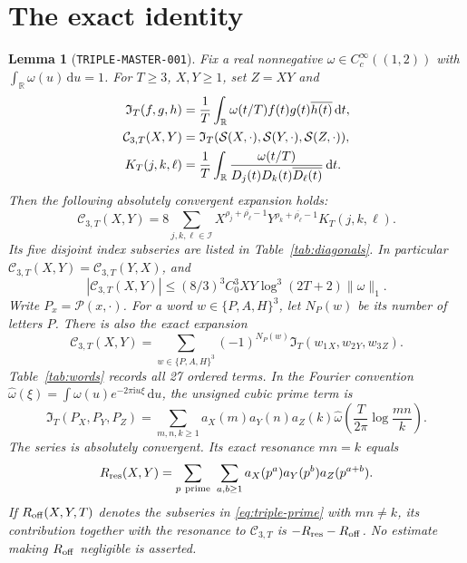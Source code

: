 \documentclass[11pt]{article}
\newtheorem{lemma}{Lemma}
\newcommand{\ii}{\mathrm i}
\newcommand{\ZS}{\mathcal S}
\newcommand{\PS}{\mathcal P}
\newcommand{\CT}{\mathcal C_{3,T}}
\newcommand{\IT}{\mathfrak I_T}
\newcommand{\dd}{\,\mathrm d}
\begin{document}
\section{The exact identity}

\begin{lemma}[\texttt{TRIPLE-MASTER-001}]\label{lem:triple-master}
Fix a real nonnegative \(\omega\in C_c^\infty((1,2))\) with
\(\int_{\mathbb R}\omega(u)\dd u=1\). For \(T\geq3\), \(X,Y\geq1\),
set \(Z=XY\) and
\begin{align}
 \IT(f,g,h)&=\frac1T\int_{\mathbb R}\omega(t/T)f(t)g(t)\overline{h(t)}\dd t,
       \label{eq:triple-I}\\
 \CT(X,Y)&=\IT(\ZS(X,\cdot),\ZS(Y,\cdot),\ZS(Z,\cdot)),\notag\\
 K_T(j,k,\ell)&=\frac1T\int_{\mathbb R}
       \frac{\omega(t/T)}{D_j(t)D_k(t)\overline{D_\ell(t)}}\dd t.
       \label{eq:triple-K}
\end{align}
Then the following absolutely convergent expansion holds:
\begin{equation}\label{eq:triple-zero}
 \CT(X,Y)=8\sum_{j,k,\ell\in\mathcal I}
 X^{\rho_j+\overline{\rho_\ell}-1}
 Y^{\rho_k+\overline{\rho_\ell}-1}K_T(j,k,\ell).
\end{equation}
Its five disjoint index subseries are listed in Table~\ref{tab:diagonals}.
In particular \(\CT(X,Y)=\CT(Y,X)\), and
\begin{equation}\label{eq:triple-majorant}
 |\CT(X,Y)|\leq(8/3)^3 C_0^3XY\log^3(2T+2)\|\omega\|_1.
\end{equation}
Write \(P_x=\PS(x,\cdot)\). For a word \(w\in\{P,A,H\}^3\),
let \(N_P(w)\) be its number of letters \(P\). There is also the exact expansion
\begin{equation}\label{eq:triple-27}
 \CT(X,Y)=\sum_{w\in\{P,A,H\}^3}(-1)^{N_P(w)}
 \IT(w_1{}_X,w_2{}_Y,w_3{}_Z).
\end{equation}
Table~\ref{tab:words} records all 27 ordered terms. In the Fourier convention
\(\widehat\omega(\xi)=\int\omega(u)e^{-2\pi\ii u\xi}\dd u\),
the unsigned cubic prime term is
\begin{equation}\label{eq:triple-prime}
 \IT(P_X,P_Y,P_Z)=\sum_{m,n,k\geq1}a_X(m)a_Y(n)a_Z(k)
 \widehat\omega\!\left(\frac{T}{2\pi}\log\frac{mn}{k}\right).
\end{equation}
The series is absolutely convergent. Its exact resonance \(mn=k\) equals
\begin{equation}\label{eq:triple-resonance}
 R_{\rm res}(X,Y)=\sum_{p\ {\rm prime}}\ \sum_{a,b\geq1}
       a_X(p^a)a_Y(p^b)a_Z(p^{a+b}).
\end{equation}
If \(R_{\rm off}(X,Y,T)\) denotes the subseries in
\eqref{eq:triple-prime} with \(mn\ne k\), its contribution together with
the resonance to \(\CT\) is \(-R_{\rm res}-R_{\rm off}\).
No estimate making \(R_{\rm off}\) negligible is asserted.
\end{lemma}
\end{document}
